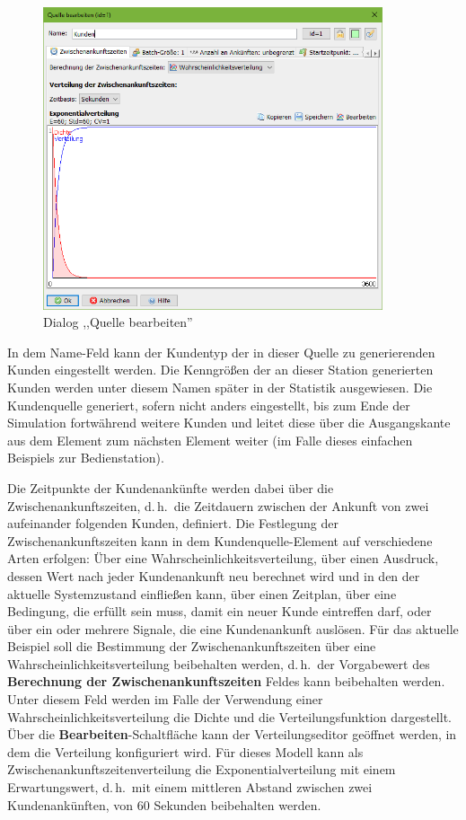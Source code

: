 \documentclass[deutsch]{svmono}
\begin{document}
\begin{figure}[H]	
	\caption{Dialog ,,Quelle bearbeiten''}
	\centerline{\includegraphics[width=10cm]{DialogSource.png}}
	\label{fig:DialogSource}
\end{figure}
 
In dem Name-Feld kann der Kundentyp der in dieser Quelle zu generierenden Kunden eingestellt werden. Die Kenngrößen der an dieser Station generierten Kunden werden unter diesem Namen später in der Statistik ausgewiesen. Die Kundenquelle generiert, sofern nicht anders eingestellt, bis zum Ende der Simulation fortwährend weitere Kunden und leitet diese über die Ausgangskante aus dem Element zum nächsten Element weiter (im Falle dieses einfachen Beispiels zur Bedienstation).

Die Zeitpunkte der Kundenankünfte werden dabei über die Zwischenankunftszeiten, d.\,h.\ die Zeitdauern zwischen der Ankunft von zwei aufeinander folgenden Kunden, definiert. Die Festlegung der Zwischenankunftszeiten kann in dem Kundenquelle-Element auf verschiedene Arten erfolgen: Über eine Wahrscheinlichkeitsverteilung, über einen Ausdruck, dessen Wert nach jeder Kundenankunft neu berechnet wird und in den der aktuelle Systemzustand einfließen kann, über einen Zeitplan, über eine Bedingung, die erfüllt sein muss, damit ein neuer Kunde eintreffen darf, oder über ein oder mehrere Signale, die eine Kundenankunft auslösen. Für das aktuelle Beispiel soll die Bestimmung der Zwischenankunftszeiten über eine Wahrscheinlichkeitsverteilung beibehalten werden, d.\,h.\ der Vorgabewert des \textbf{Berechnung der Zwischenankunftszeiten} Feldes kann beibehalten werden. Unter diesem Feld werden im Falle der Verwendung einer Wahrscheinlichkeitsverteilung die Dichte und die Verteilungsfunktion dargestellt. Über die \textbf{Bearbeiten}-Schaltfläche kann der Verteilungseditor geöffnet werden, in dem die Verteilung konfiguriert wird. Für dieses Modell kann als Zwischenankunftszeitenverteilung die Exponentialverteilung mit einem Erwartungswert, d.\,h.\ mit einem mittleren Abstand zwischen zwei Kundenankünften, von 60 Sekunden beibehalten werden.
\end{document}
